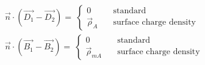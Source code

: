 \begin{itemize}
        \begin{align*}
            &\vec{n} \cdot \left(\vec{D_1} - \vec{D_2}\right) =\
            \begin{cases} 0 & \quad \text{standard}\\ \vec{\rho}_A & \quad \text{surface charge density} \end{cases}\\
            &\vec{n} \cdot \left(\vec{B_1} - \vec{B_2}\right) =\
            \begin{cases} 0 & \quad \text{standard}\\ \vec{\rho}_{mA} & \quad \text{surface charge density} \end{cases}\\
        \end{align*}
\end{itemize}
